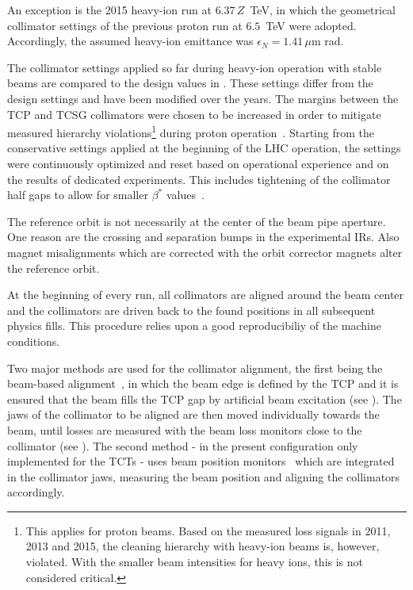An exception is the 2015 heavy-ion run at $6.37\,Z$~TeV, in which the geometrical collimator settings of the previous proton run at $6.5$~TeV were adopted. Accordingly, the assumed heavy-ion emittance was $\epsilon_N = 1.41\,\mu$m rad. 
%
% 
% 

The collimator settings applied so far during heavy-ion operation with stable beams are compared to the design values in . These settings differ from the design settings and have been modified over the years. The margins between the TCP and TCSG collimators were chosen to be increased in order to mitigate measured hierarchy violations\footnote{This applies for proton beams. Based on the measured loss signals in 2011, 2013 and 2015, the cleaning hierarchy with heavy-ion beams is, however, violated. With the smaller beam intensities for heavy ions, this is not considered critical.} during proton operation~\cite{Bruce2014a}. Starting from the conservative settings applied at the beginning of the LHC operation, the settings were continuously optimized and reset based on operational experience and on the results of dedicated experiments. This includes tightening of the collimator half gaps to allow for smaller $\beta^*$ values~\cite{PhysRevSTAB.18.061001}.

The reference orbit is not necessarily at the center of the beam pipe aperture. One reason are the crossing and separation bumps in the experimental IRs. Also magnet misalignments which are corrected with the orbit corrector magnets alter the reference orbit. 

At the beginning of every run, all collimators are aligned around the beam center and the collimators are driven back to the found positions in all subsequent physics fills. This procedure relies upon a good reproducibiliy of the machine conditions. 

Two major methods are used for the collimator alignment, the first being the beam-based alignment~\cite{ipac2011:thpz034}, in which the beam edge is defined by the TCP and it is ensured that the beam fills the TCP gap by artificial beam excitation (see ). The jaws of the collimator to be aligned are then moved individually towards the beam, until losses are measured with the beam loss monitors close to the collimator (see ). The second method - in the present configuration only implemented for the TCTs - uses beam position monitors~\cite{accnote:150028} which are integrated in the collimator jaws, measuring the beam position and aligning the collimators accordingly.




